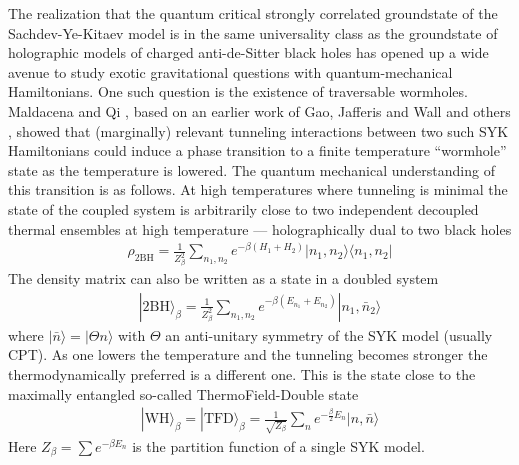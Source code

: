 \noindent
The realization that the quantum critical strongly correlated groundstate of the Sachdev-Ye-Kitaev model 
is in the same universality class as the groundstate of holographic models of charged anti-de-Sitter black holes has opened up a wide avenue to study exotic gravitational questions with quantum-mechanical Hamiltonians. One such question is the existence of traversable wormholes. Maldacena and Qi \cite{maldacena2018eternal}, based on an earlier work of Gao, Jafferis and Wall \cite{gaoTraversableWormholesDouble2017} and others \cite{maldacenaDivingTraversableWormholes2017,maldacenaTraversableWormholesFour2020,bakBulkViewTeleportation2018,gaoRegenesisQuantumTraversable2019,fuTraversableAsymptoticallyFlat2019,bakExperimentalProbesTraversable2019} , showed that (marginally) relevant tunneling interactions between two such SYK Hamiltonians could induce a phase transition to a finite temperature ``wormhole'' state as the temperature is lowered. The quantum mechanical understanding of this transition is as follows. At high temperatures where tunneling is minimal the state of the coupled system is arbitrarily close to two independent decoupled thermal ensembles at high temperature --- holographically dual to two black holes
\begin{align}
    \rho_{\text{2BH}} = \frac{1}{Z_{\beta}^2}\sum_{n_1,n_2} e^{-\beta (H_1+H_2)} |n_1,n_2\rangle\langle n_1,n_2|
\end{align}
The density matrix can also be written as a state in a doubled system
\begin{align}
|\text{2BH}\rangle_{\beta} = \frac{1}{Z_{\beta}^2}\sum_{n_1,n_2} e^{-\beta (E_{n_1}+E_{n_2})} |n_1,\bar{n}_2\rangle
\end{align}
where $|\bar{n}\rangle = |\Theta n\rangle$ with $\Theta$ an anti-unitary symmetry of the SYK model (usually CPT).
As one lowers the temperature and the tunneling becomes stronger the thermodynamically preferred is a different one. This is the state close to the maximally entangled so-called ThermoField-Double state
\begin{align}
    |\text{WH}\rangle_{\beta} =|\text{TFD}\rangle_{\beta} = \frac{1}{\sqrt{Z_{\beta}}}\sum_n e^{-\frac{\beta}{2}E_{n}} |n,\bar{n}\rangle
\end{align}
Here $Z_{\beta}=\sum e^{-\beta E_n}$ is the partition function of a single SYK model.
